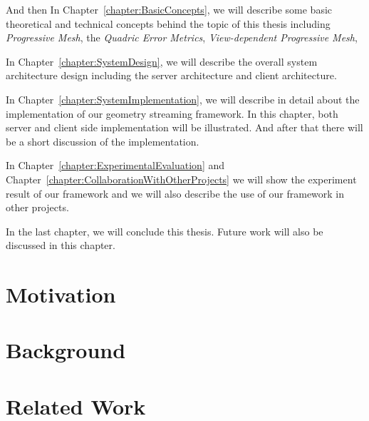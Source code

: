 \smallskip
And then In Chapter~\ref{chapter:BasicConcepts}, we will describe some basic theoretical and technical concepts behind the topic of this thesis including \emph{Progressive Mesh}, the \emph{Quadric Error Metrics}, \emph{View-dependent Progressive Mesh}, \etc

\smallskip
In Chapter~\ref{chapter:SystemDesign}, we will describe the overall system architecture design including the server architecture and client architecture. 

\smallskip
In Chapter~\ref{chapter:SystemImplementation}, we will describe in detail about the implementation of our geometry streaming framework. In this chapter, both server and client side implementation will be illustrated. And after that there will be a short discussion of the implementation. 

\smallskip
In Chapter~\ref{chapter:ExperimentalEvaluation} and Chapter~\ref{chapter:CollaborationWithOtherProjects} we will show the experiment result of our framework and we will also describe the use of our framework in other projects. 

In the last chapter, we will conclude this thesis. Future work will also be discussed in this chapter. 

\section{Motivation}
\label{section:motivation}


\section{Background}
\label{section:background}

\section{Related Work}
\label{section:relWork}



